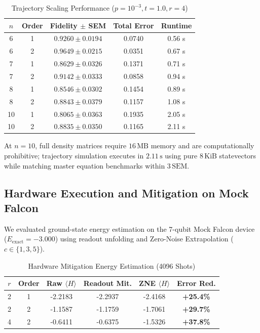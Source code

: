 \documentclass[conference]{IEEEtran}
\begin{document}
\begin{table}[htbp]
\caption{Trajectory Scaling Performance ($p = 10^{-3}, t = 1.0, r = 4$)}
\begin{center}
\begin{tabular}{ccccc}
\toprule
$n$ & Order & Fidelity $\pm$ SEM & Total Error & Runtime \\
\midrule
6  & 1 & $0.9260 \pm 0.0194$ & 0.0740 & 0.56 s \\
6  & 2 & $0.9649 \pm 0.0215$ & 0.0351 & 0.67 s \\
7  & 1 & $0.8629 \pm 0.0326$ & 0.1371 & 0.71 s \\
7  & 2 & $0.9142 \pm 0.0333$ & 0.0858 & 0.94 s \\
8  & 1 & $0.8546 \pm 0.0302$ & 0.1454 & 0.89 s \\
8  & 2 & $0.8843 \pm 0.0379$ & 0.1157 & 1.08 s \\
10 & 1 & $0.8065 \pm 0.0363$ & 0.1935 & 2.05 s \\
10 & 2 & $0.8835 \pm 0.0350$ & 0.1165 & 2.11 s \\
\bottomrule
\end{tabular}
\end{center}
\label{tab:trajectories}
\end{table}

At $n = 10$, full density matrices require $16\,\text{MB}$ memory and are computationally prohibitive; trajectory simulation executes in $2.11\,\text{s}$ using pure $8\,\text{KiB}$ statevectors while matching master equation benchmarks within $3\,\text{SEM}$.

\subsection{Hardware Execution and Mitigation on Mock Falcon}
We evaluated ground-state energy estimation on the 7-qubit Mock Falcon device ($E_{\text{exact}} = -3.000$) using readout unfolding and Zero-Noise Extrapolation ($c \in \{1, 3, 5\}$).

\begin{table}[htbp]
\caption{Hardware Mitigation Energy Estimation (4096 Shots)}
\begin{center}
\begin{tabular}{cccccc}
\toprule
$r$ & Order & Raw $\langle H \rangle$ & Readout Mit. & ZNE $\langle H \rangle$ & Error Red. \\
\midrule
2 & 1 & -2.2183 & -2.2937 & -2.4168 & \textbf{+25.4\%} \\
2 & 2 & -1.1587 & -1.1759 & -1.7061 & \textbf{+29.7\%} \\
4 & 2 & -0.6411 & -0.6375 & -1.5326 & \textbf{+37.8\%} \\
\bottomrule
\end{tabular}
\end{center}
\label{tab:mitigation}
\end{table}
\end{document}
